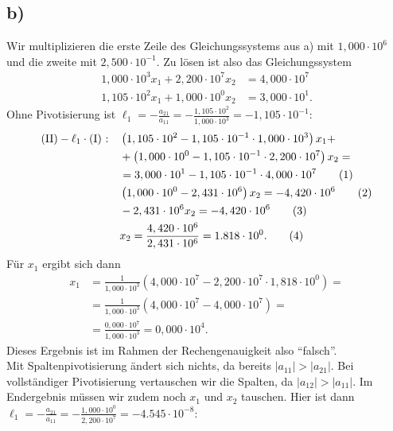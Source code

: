 \documentclass[english, parskip=full]{scrartcl}
\newcommand\numberthis{\addtocounter{equation}{1}\tag{\theequation}}
\newcommand{\kla}{}
\newcommand{\tecxt}{}
\begin{document}
\subsection*{b)}
Wir multiplizieren die erste Zeile des Gleichungssystems aus a) mit $1,000\cdot 10^6$ und die zweite mit $2,500\cdot 10^{-1}$.
Zu lösen ist also das Gleichungssystem
\begin{align}
1,000\cdot 10^{3} x_1 + 2,200\cdot 10^7 x_2 &= 4,000\cdot 10^7 \\
1,105\cdot 10^2 x_1 + 1,000\cdot 10^0 x_2 &= 3,000\cdot 10^1.
\end{align}
Ohne Pivotisierung ist $\ell_1 = -\frac{a_{21}}{a_{11}} = -\frac{1,105\cdot 10^2}{1,000\cdot 10^{3}} = -1,105\cdot 10^{-1}$:
\begin{align*}
\tecxt\text{(II)} - \ell_1\cdot \tecxt\text{(I)   :} \ \ \  &\kla\left( 1,105\cdot 10^2 - 1,105\cdot 10^{-1} \cdot 1,000\cdot 10^{3} \right)x_1 + \\
& + \kla\left( 1,000\cdot 10^0 -  1,105\cdot 10^{-1}\cdot 2,200\cdot 10^7 \right)x_2 = \\
&= 3,000\cdot 10^1 - 1,105\cdot 10^{-1}\cdot 4,000\cdot 10^7 \numberthis\\
& \kla\left( 1,000\cdot 10^0 - 2,431\cdot 10^6 \right)x_2 = -4,420\cdot 10^6 \numberthis \\
&  - 2,431\cdot 10^6 x_2 = -4,420\cdot 10^6  \numberthis \\
& x_2 = \frac{4,420\cdot 10^6}{2,431\cdot 10^6} = 1.818 \cdot 10^0. \numberthis
\end{align*}
Für $x_1$ ergibt sich dann
\begin{align}
x_1 &= \frac{1}{1,000\cdot 10^{3}}\kla\left( 4,000\cdot 10^7 - 2,200\cdot 10^7 \cdot 1,818\cdot 10^0 \right) = \\
&= \frac{1}{1,000\cdot 10^{3}}\kla\left( 4,000\cdot 10^7 - 4,000\cdot 10^7 \right) = \\
&=\frac{0,000\cdot 10^7}{1,000\cdot 10^{3}} = 0,000\cdot 10^4.
\end{align}
Dieses Ergebnis ist im Rahmen der Rechengenauigkeit also ``falsch''. 
\\
Mit Spaltenpivotisierung ändert sich nichts, da bereits $|a_{11}| > |a_{21}|$.
Bei vollständiger Pivotisierung vertauschen wir die Spalten, da $|a_{12}| > |a_{11}|$.
Im Endergebnis müssen wir zudem noch $x_1$ und $x_2$ tauschen.
Hier ist dann $\ell_1 = -\frac{a_{21}}{a_{11}} = -\frac{1,000\cdot 10^0}{2,200\cdot 10^{7}}  = -4.545\cdot 10^{-8}$:
\end{document}
